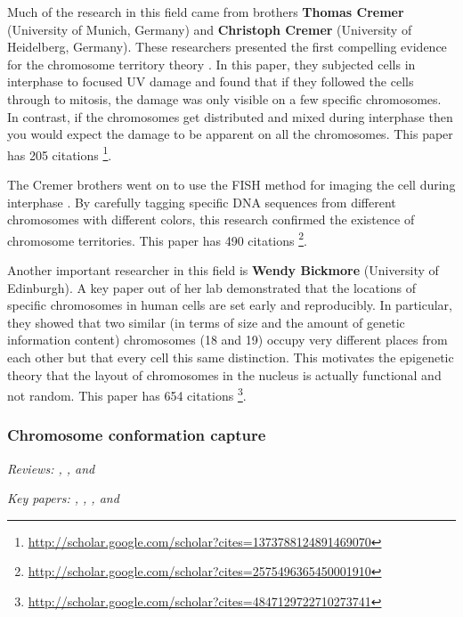 \documentclass[12pt]{article}
\begin{document}
Much of the research in this field came from brothers {\bf Thomas Cremer}
(University of Munich, Germany) and {\bf Christoph Cremer} (University of
Heidelberg, Germany).
These researchers presented the first compelling evidence for the chromosome
territory theory \cite{hamster}.
In this paper, they subjected cells in interphase to focused UV damage and
found that if they followed the cells through to mitosis, the damage was only
visible on a few specific chromosomes.
In contrast, if the chromosomes get distributed and mixed during interphase
then you would expect the damage to be apparent on all the chromosomes.
This paper has 205 citations%
\footnote{\url{http://scholar.google.com/scholar?cites=1373788124891469070}}.


The Cremer brothers went on to use the FISH method for imaging the cell during
interphase \cite{cremer}.
By carefully tagging specific DNA sequences from different chromosomes with
different colors, this research confirmed the existence of chromosome
territories.
This paper has 490 citations%
\footnote{\url{http://scholar.google.com/scholar?cites=2575496365450001910}}.

Another important researcher in this field is {\bf Wendy Bickmore} (University
of Edinburgh).
A key paper out of her lab \cite{local} demonstrated that the locations of
specific chromosomes in human cells are set early and reproducibly.
In particular, they showed that two similar (in terms of size and the amount
of genetic information content) chromosomes (18 and 19) occupy very different
places from each other but that every cell this same distinction.
This motivates the epigenetic theory that the layout of chromosomes in the
nucleus is actually functional and not random.
This paper has 654 citations%
\footnote{\url{http://scholar.google.com/scholar?cites=4847129722710273741}}.


\subsubsection*{Chromosome conformation capture}

\emph{Reviews: \cite{3c-review1}, \cite{3c-review2}, and \cite{3c-review3}}

\noindent\emph{Key papers: \cite{ccc}, \cite{looping}, \cite{4c}, and
\cite{5c}}
\end{document}
